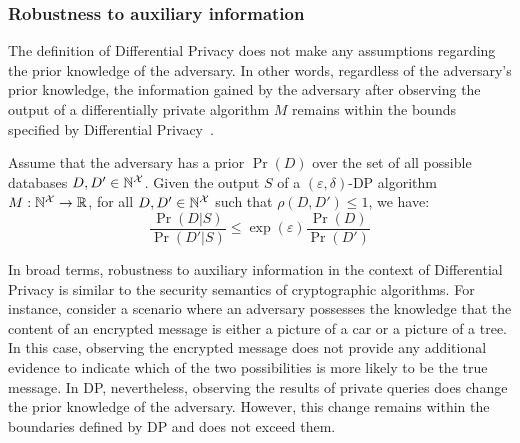 \subsubsection{Robustness to auxiliary information}
\label{subsubsec:dp-auxiliary}
The definition of Differential Privacy does not make any assumptions regarding the prior knowledge of the adversary. 
In other words, regardless of the adversary's prior knowledge, the information gained by the adversary after observing the output of a differentially private algorithm $M$ remains within the bounds specified by Differential Privacy~\cite{dwork2014algorithmic}. 
\begin{proposition}
  \label{prop:auxiliary}
  Assume that the adversary has a prior $\Pr(D)$ over the set of all possible databases $D, D' \in \mathbb{N}^\mathcal{X}$. Given the output $S$ of a $(\varepsilon, \delta)$-DP algorithm $M: \mathbb{N}^\mathcal{X} \rightarrow \mathbb{R}$, for all $D, D' \in \mathbb{N}^\mathcal{X}$ such that $\rho(D, D') \leq 1$, we have: 
  \begin{equation*}
    \frac{\Pr(D|S)}{\Pr(D'|S)} \leq \exp(\varepsilon) \frac{\Pr(D)}{\Pr(D')}
  \end{equation*}
\end{proposition}
In broad terms, robustness to auxiliary information in the context of Differential Privacy is similar to the security semantics of cryptographic algorithms. 
For instance, consider a scenario where an adversary possesses the knowledge that the content of an encrypted message is either a picture of a car or a picture of a tree.
In this case, observing the encrypted message does not provide any additional evidence to indicate which of the two possibilities is more likely to be the true message.
In DP, nevertheless, observing the results of private queries does change the prior knowledge of the adversary.
However, this change remains within the boundaries defined by DP and does not exceed them.

